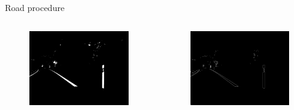 \documentclass[12pt]{beamer}
\begin{document}
\begin{frame}{Road procedure}
\begin{columns}
{\begin{figure}
            \includegraphics[width=\textwidth]{resources/png/roadnosky.png}
        \end{figure}
        \vspace{-1.3em}
        \begin{figure}
            \includegraphics[width=\textwidth]{resources/png/roadcanny.png}
        \end{figure}
    }
\end{columns}
\end{frame}
\end{document}
